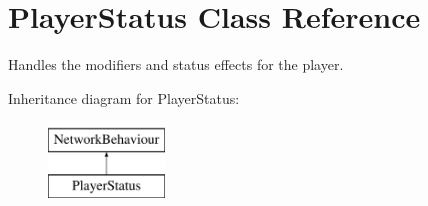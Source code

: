 \hypertarget{class_player_status}{}\section{Player\+Status Class Reference}
\label{class_player_status}


Handles the modifiers and status effects for the player.  


Inheritance diagram for Player\+Status\+:\begin{figure}[H]
\begin{center}
\leavevmode
\includegraphics[height=2.000000cm]{class_player_status}
\end{center}
\end{figure}
